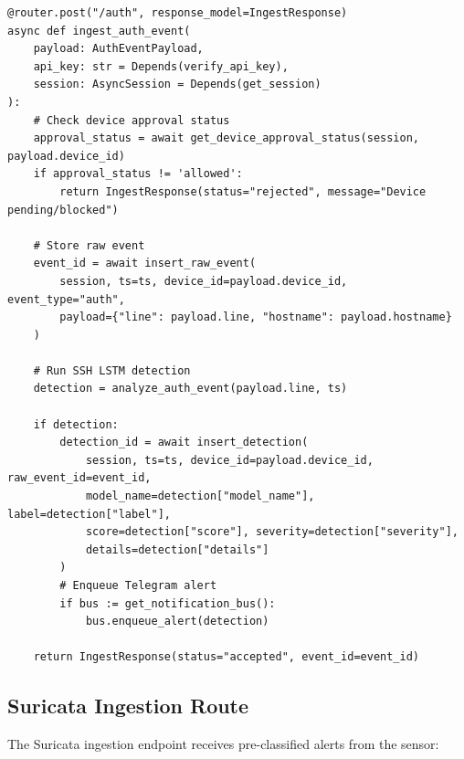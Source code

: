 \documentclass[12pt,a4paper]{report} %
\begin{document}
\begin{lstlisting}[style=python,caption=Auth Ingestion (auth\_ingest.py)]
@router.post("/auth", response_model=IngestResponse)
async def ingest_auth_event(
    payload: AuthEventPayload,
    api_key: str = Depends(verify_api_key),
    session: AsyncSession = Depends(get_session)
):
    # Check device approval status
    approval_status = await get_device_approval_status(session, payload.device_id)
    if approval_status != 'allowed':
        return IngestResponse(status="rejected", message="Device pending/blocked")

    # Store raw event
    event_id = await insert_raw_event(
        session, ts=ts, device_id=payload.device_id, event_type="auth", 
        payload={"line": payload.line, "hostname": payload.hostname}
    )

    # Run SSH LSTM detection
    detection = analyze_auth_event(payload.line, ts)
    
    if detection:
        detection_id = await insert_detection(
            session, ts=ts, device_id=payload.device_id, raw_event_id=event_id,
            model_name=detection["model_name"], label=detection["label"],
            score=detection["score"], severity=detection["severity"],
            details=detection["details"]
        )
        # Enqueue Telegram alert
        if bus := get_notification_bus():
            bus.enqueue_alert(detection)

    return IngestResponse(status="accepted", event_id=event_id)
\end{lstlisting}



\subsection{Suricata Ingestion Route}
The Suricata ingestion endpoint receives pre-classified alerts from the sensor:
\end{document}
